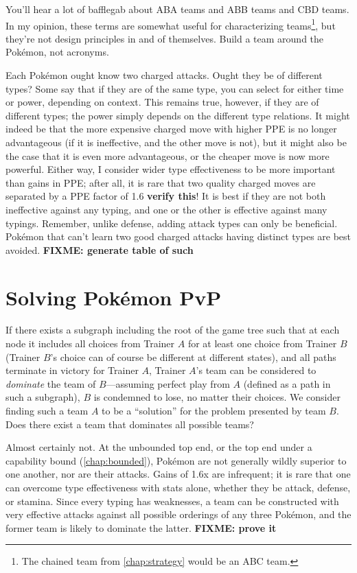 \begin{tipbox}[title=Dubwool+Wooloo+Mareep is a BAA team]
You'll hear a lot of bafflegab about ABA teams and ABB teams and CBD teams.
  In my opinion, these terms are somewhat useful for characterizing teams\footnote{The chained team
  from \autoref{chap:strategy} would be an ABC team.}, but they're not
  design principles in and of themselves.
Build a team around the Pokémon, not acronyms.
\end{tipbox}

Each Pokémon ought know two charged attacks.
Ought they be of different types?
Some say that if they are of the same type, you can select for either time or power, depending on context.
This remains true, however, if they are of different types; the power simply depends on
  the different type relations.
It might indeed be that the more expensive charged move with higher PPE is no
  longer advantageous (if it is ineffective, and the other move is not),
  but it might also be the case that it is even more advantageous,
  or the cheaper move is now more powerful.
Either way, I consider wider type effectiveness to be more important than gains in PPE;
  after all, it is rare that two quality charged moves are separated by a PPE factor
  of 1.6 \textbf{verify this}!
It is best if they are not both ineffective against any typing, and one or the
  other is effective against many typings.
Remember, unlike defense, adding attack types can only be beneficial.
Pokémon that can't learn two good charged attacks having distinct types are best avoided.
\textbf{FIXME: generate table of such}


\section{Solving Pokémon PvP}
If there exists a subgraph including the root of the game tree such that at each
  node it includes all choices from Trainer $A$ for at least one choice from Trainer $B$
  (Trainer $B$'s choice can of course be different at different states), and all
  paths terminate in victory for Trainer $A$, Trainer $A$'s team can be considered
  to \textit{dominate} the team of $B$---assuming perfect play from $A$ (defined
  as a path in such a subgraph), $B$ is condemned to lose, no matter their choices.
We consider finding such a team $A$ to be a ``solution'' for the problem presented
  by team $B$.
Does there exist a team that dominates all possible teams?

Almost certainly not.
At the unbounded top end, or the top end under a capability bound (\autoref{chap:bounded}), Pokémon are not generally
  wildly superior to one another, nor are their attacks.
Gains of 1.6x are infrequent; it is rare that one can overcome type
  effectiveness with stats alone, whether they be attack, defense, or stamina.
Since every typing has weaknesses, a team can be constructed with
  very effective attacks against all possible orderings of any three Pokémon,
  and the former team is likely to dominate the latter.
\textbf{FIXME: prove it}
